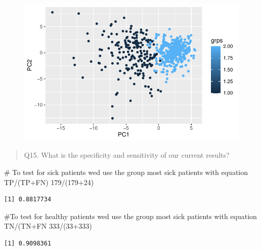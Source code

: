 \documentclass[
  letterpaper,
  DIV=11,
  numbers=noendperiod]{scrartcl}
\newenvironment{Shaded}{\begin{snugshade}}{\end{snugshade}}
\newcommand{\CommentTok}[1]{\textcolor[rgb]{0.37,0.37,0.37}{#1}}
\newcommand{\DecValTok}[1]{\textcolor[rgb]{0.68,0.00,0.00}{#1}}
\newcommand{\NormalTok}[1]{\textcolor[rgb]{0.00,0.23,0.31}{#1}}
\newcommand{\SpecialCharTok}[1]{\textcolor[rgb]{0.37,0.37,0.37}{#1}}
\begin{document}
\begin{figure}[H]

{\centering \includegraphics{Class-8-mini-project_files/figure-pdf/unnamed-chunk-17-1.pdf}

}

\end{figure}

\begin{quote}
Q15. What is the specificity and sensitivity of our current results?
\end{quote}

\begin{Shaded}
\begin{Highlighting}[]
\CommentTok{\# To test for sick patients we\textquotesingle{}d use the group most sick patients with equation TP/(TP+FN)}
\DecValTok{179}\SpecialCharTok{/}\NormalTok{(}\DecValTok{179}\SpecialCharTok{+}\DecValTok{24}\NormalTok{)}
\end{Highlighting}
\end{Shaded}

\begin{verbatim}
[1] 0.8817734
\end{verbatim}

\begin{Shaded}
\begin{Highlighting}[]
\CommentTok{\#To test for healthy patients we\textquotesingle{}d use the group most sick patients with equation  TN/(TN+FN}
\DecValTok{333}\SpecialCharTok{/}\NormalTok{(}\DecValTok{33}\SpecialCharTok{+}\DecValTok{333}\NormalTok{)}
\end{Highlighting}
\end{Shaded}

\begin{verbatim}
[1] 0.9098361
\end{verbatim}
\end{document}
